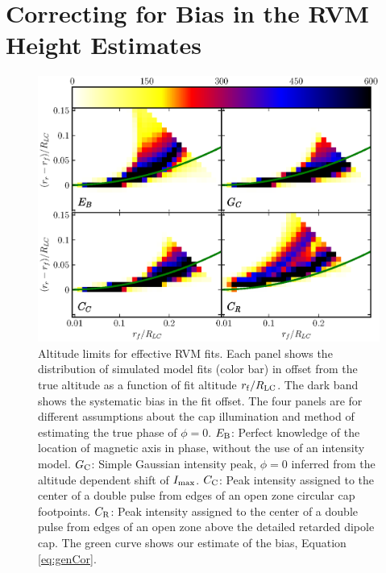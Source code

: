 \section{Correcting for Bias in the RVM Height Estimates}
\label{sec:correctionRVM}





\begin{figure}[t!!]
\begin{center}
\includegraphics[width=\textwidth]{chapters/BCWlimitations/figures/totDirFitPhi.eps}
\caption[Altitude limits for effective RVM fits]{
Altitude limits for effective RVM fits.  Each panel shows the distribution
of simulated model fits (color bar) in offset from the true altitude as a function 
of fit altitude $r_{\rm{f}}/R_{\rm{LC}}$. The dark band shows the systematic bias in the 
fit offset. The four panels are for different assumptions about the cap 
illumination and method of estimating the true phase of $\phi=0$.
$E_{\rm{B}}$: Perfect knowledge of the location of magnetic axis in phase, without the use of an intensity model.
$G_{\rm{C}}$: Simple Gaussian intensity peak, $\phi=0$ inferred from the altitude dependent shift of $I_{\rm{max}}$. 
$C_{\rm{C}}$: Peak intensity assigned to the center of a double pulse from edges of an open zone circular cap footpoints.
$C_{\rm{R}}$: Peak intensity assigned to the center of a double pulse from edges of an open zone above the detailed retarded dipole cap.
The green curve shows our estimate of the bias, Equation \ref{eq:genCor}.
}
\label{fig:totDirFitPhiBCWlim}
\end{center}
\end{figure}


